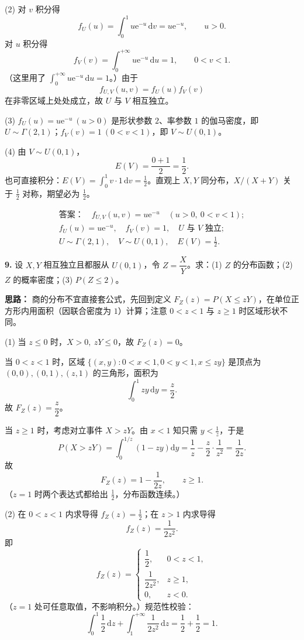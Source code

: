 (2) 对 $v$ 积分得
\[
f_U(u)=\int_0^1 u\mathrm e^{-u}\,\mathrm dv=u\mathrm e^{-u},\qquad u>0.
\]
对 $u$ 积分得
\[
f_V(v)=\int_0^{+\infty}u\mathrm e^{-u}\,\mathrm du=1,\qquad 0<v<1.
\]
（这里用了 $\int_0^{+\infty}u\mathrm e^{-u}\,\mathrm du=1$。）由于
\[
f_{U,V}(u,v)=f_U(u)f_V(v)
\]
在非零区域上处处成立，故 $U$ 与 $V$ 相互独立。

(3) $f_U(u)=u\mathrm e^{-u}\ (u>0)$ 是形状参数 $2$、率参数 $1$ 的伽马密度，即 $U\sim \Gamma(2,1)$；$f_V(v)=1\ (0<v<1)$，即 $V\sim U(0,1)$。

(4) 由 $V\sim U(0,1)$，
\[
E(V)=\frac{0+1}{2}=\frac12.
\]
也可直接积分：$E(V)=\int_0^1 v\cdot1\,\mathrm dv=\frac12$。直观上 $X,Y$ 同分布，$X/(X+Y)$ 关于 $\frac12$ 对称，期望必为 $\frac12$。

\[
\boxed{\begin{gathered}
\textbf{答案：}\quad f_{U,V}(u,v)=u\mathrm e^{-u}\quad (u>0,\ 0<v<1);\\
f_U(u)=u\mathrm e^{-u},\quad f_V(v)=1,\quad U\text{ 与 }V\text{ 独立};\\
U\sim\Gamma(2,1),\quad V\sim U(0,1),\quad E(V)=\frac12.
\end{gathered}}
\]

\else \answerarea[10] \fi%
\textbf{9.} 设 $X,Y$ 相互独立且都服从 $U(0,1)$，令 $Z=\dfrac{X}{Y}$。求：(1) $Z$ 的分布函数；(2) $Z$ 的概率密度；(3) $P(Z\leq2)$。

\ifshowsolutions%
\textbf{思路：} 商的分布不宜直接套公式，先回到定义 $F_Z(z)=P(X\leq zY)$，在单位正方形内用面积（因联合密度为 $1$）计算；注意 $0<z<1$ 与 $z\geq1$ 时区域形状不同。

(1) 当 $z\leq0$ 时，$X>0,\ zY\leq0$，故 $F_Z(z)=0$。

当 $0<z<1$ 时，区域 $\{(x,y):0<x<1,0<y<1,x\leq zy\}$ 是顶点为 $(0,0),(0,1),(z,1)$ 的三角形，面积为
\[
\int_0^1 zy\,\mathrm dy=\frac z2.
\]
故 $F_Z(z)=\dfrac z2$。

当 $z\geq1$ 时，考虑对立事件 $X>zY$。由 $x<1$ 知只需 $y<\frac1z$，于是
\[
P(X>zY)=\int_0^{1/z}\left(1-zy\right)\mathrm dy
=\frac1z-\frac{z}{2}\cdot\frac{1}{z^2}
=\frac{1}{2z}.
\]
故
\[
F_Z(z)=1-\frac{1}{2z},\qquad z\geq1.
\]
（$z=1$ 时两个表达式都给出 $\frac12$，分布函数连续。）

(2) 在 $0<z<1$ 内求导得 $f_Z(z)=\frac12$；在 $z>1$ 内求导得
\[
f_Z(z)=\frac{1}{2z^2}.
\]
即
\[
f_Z(z)=\begin{cases}
\dfrac12, & 0<z<1,\\[4pt]
\dfrac{1}{2z^2}, & z\geq1,\\[4pt]
0, & z<0.
\end{cases}
\]
（$z=1$ 处可任意取值，不影响积分。）规范性校验：
\[
\int_0^1\frac12\,\mathrm dz+\int_1^{+\infty}\frac{1}{2z^2}\,\mathrm dz
=\frac12+\frac12=1.
\]

